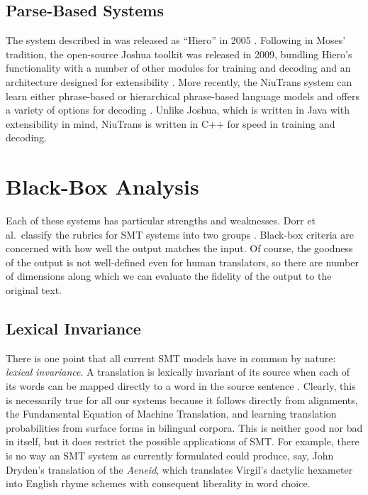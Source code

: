 \documentclass[11pt]{article}
\begin{document}

\subsection{Parse-Based Systems}
The system described in \cite{chiang:05} was released as ``Hiero'' in 2005 \cite{hiero}.
Following in Moses' tradition, the open-source Joshua toolkit was released in 2009,
bundling Hiero's functionality with a number of other modules for training and decoding
and an architecture designed for extensibility \cite{joshua}.
More recently, the NiuTrans system can learn either phrase-based or hierarchical phrase-based
language models and offers a variety of options for decoding \cite{niutrans}.
Unlike Joshua, which is written in Java with extensibility in mind,
NiuTrans is written in C++ for speed in training and decoding.

\section{Black-Box Analysis}
Each of these systems has particular strengths and weaknesses. Dorr et al.\ classify the rubrics 
for SMT systems into two groups \cite{dorr_survey}. Black-box criteria are concerned with how well the output matches
the input. Of course, the goodness of the output is not well-defined even for human translators,
so there are number of dimensions along which we can evaluate the fidelity of the output to the original text.

\subsection{Lexical Invariance}

There is one point that all current SMT models have in common by nature: \textit{lexical invariance}.
A translation is lexically invariant of its source when each of its words can be mapped directly
to a word in the source sentence \cite{dorr_survey}. Clearly, this is necessarily true
for all our systems because it follows directly from alignments, the Fundamental Equation of Machine Translation,
and learning translation probabilities from surface forms in bilingual corpora.
This is neither good nor bad in itself, but it does restrict the possible applications of SMT.
For example, there is no way an SMT system as currently formulated could produce, say, John Dryden's translation of the 
\textit{Aeneid}, which translates Virgil's dactylic hexameter into English rhyme schemes with consequent liberality in word choice.
\end{document}

